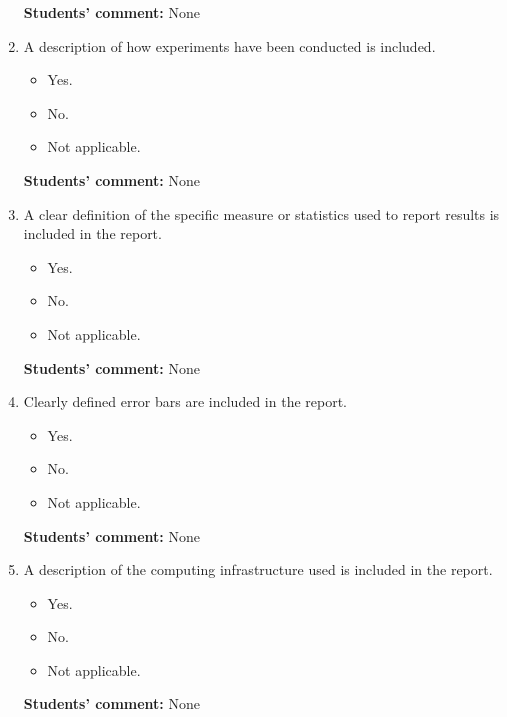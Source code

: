 \documentclass{article}
\begin{document}
\begin{enumerate}
    \textbf{Students' comment:} None
    
    \item A description of how experiments have been conducted is included.
    \begin{itemize}
        \item [\faSquareO] Yes.
        \item [\faSquareO] No.
        \item [\faSquareO] Not applicable.
    \end{itemize}
    
    \textbf{Students' comment:} None
    
    \item A clear definition of the specific measure or statistics used to report results is included in the report.
    \begin{itemize}
        \item [\faCheckSquareO] Yes.
        \item [\faSquareO] No.
        \item [\faSquareO] Not applicable.
    \end{itemize}
    
    \textbf{Students' comment:} None
    
    \item Clearly defined error bars are included in the report.
    \begin{itemize}
        \item [\faSquareO] Yes.
        \item [\faSquareO] No.
        \item [\faCheckSquareO] Not applicable.
    \end{itemize}
    
    \textbf{Students' comment:} None
    
    \item A description of the computing infrastructure used is included in the report.
    \begin{itemize}
        \item [\faCheckSquareO] Yes.
        \item [\faSquareO] No.
        \item [\faSquareO] Not applicable.
    \end{itemize}
    
    \textbf{Students' comment:} None
\end{enumerate}
\end{document}
